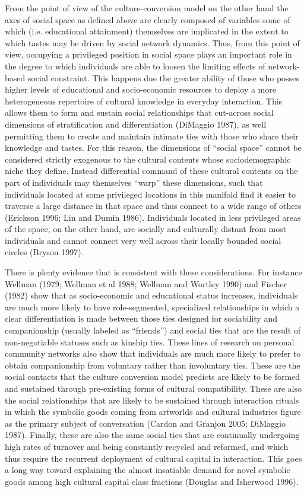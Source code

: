 \documentclass[
]{article}
\begin{document}
From the point of view of the culture-conversion model on the other hand the axes of social space as defined above are clearly composed of variables some of which (i.e. educational attainment) themselves are implicated in the extent to which tastes may be driven by social network dynamics. Thus, from this point of view, occupying a privileged position in social space plays an important role in the degree to which individuals are able to loosen the limiting effects of network-based social constraint. This happens due the greater ability of those who posses higher levels of educational and socio-economic resources to deploy a more heterogeneous repertoire of cultural knowledge in everyday interaction. This allows them to form and sustain social relationships that cut-across social dimensions of stratification and differentiation (DiMaggio 1987), as well permitting them to create and maintain intimate ties with those who share their knowledge and tastes. For this reason, the dimensions of ``social space'' cannot be considered strictly exogenous to the cultural contents whose sociodemographic niche they define. Instead differential command of these cultural contents on the part of individuals may themselves ``warp'' these dimensions, such that individuals located at some privileged locations in this manifold find it easier to traverse a large distance in that space and thus connect to a wide range of others (Erickson 1996; Lin and Dumin 1986). Individuals located in less privileged areas of the space, on the other hand, are socially and culturally distant from most individuals and cannot connect very well across their locally bounded social circles (Bryson 1997).

There is plenty evidence that is consistent with these considerations. For instance Wellman (1979; Wellman et al 1988; Wellman and Wortley 1990) and Fischer (1982) show that as socio-economic and educational status increases, individuals are much more likely to have role-segmented, specialized relationships in which a clear differentiation is made between those ties designed for sociability and companionship (usually labeled as ``friends'') and social ties that are the result of non-negotiable statuses such as kinship ties. These lines of research on personal community networks also show that individuals are much more likely to prefer to obtain companionship from voluntary rather than involuntary ties. These are the social contacts that the culture conversion model predicts are likely to be formed and sustained through pre-existing forms of cultural compatibility. These are also the social relationships that are likely to be sustained through interaction rituals in which the symbolic goods coming from artworlds and cultural industries figure as the primary subject of conversation (Cardon and Granjon 2005; DiMaggio 1987). Finally, these are also the same social ties that are continually undergoing high rates of turnover and being constantly recycled and reformed, and which thus require the recurrent deployment of cultural capital in interaction. This goes a long way toward explaining the almost insatiable demand for novel symbolic goods among high cultural capital class fractions (Douglas and Isherwood 1996).
\end{document}
